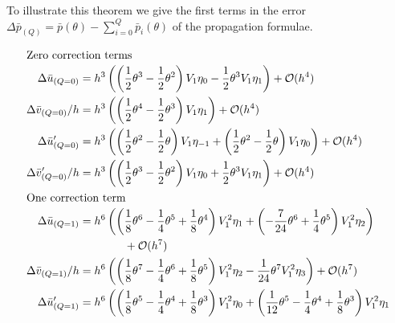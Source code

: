 To illustrate this theorem we give the first terms in the error $\Delta \bar{p}_{(Q)} = \bar{p}(\theta) - \displaystyle\sum_{i=0}^{Q} \bar{p}_{i}(\theta)$  of the propagation formulae.

\begin{align*}
  \intertext{Zero correction terms}
  \Delta \bar{u}_{(Q=0)}    & = h^{3}\left(\left(\frac{1}{2} \theta^{3} - \frac{1}{2} \theta^{2}\right) V_{1} \eta_{0} -\frac{1}{2} \theta^{3} V_{1} \eta_{1}\right) + \mathcal{O}(h^{4})                                                                              \\
  \Delta \bar{v}_{(Q=0)}/h  & = h^{3}\left(\left(\frac{1}{2} \theta^{4} - \frac{1}{2} \theta^{3}\right) V_{1} \eta_{1}\right) + \mathcal{O}(h^{4})                                                                                                                     \\
  \Delta \bar{u}'_{(Q=0)}   & = h^{3}\left(\left(\frac{1}{2} \theta^{2} - \frac{1}{2} \theta\right) V_{1} \eta_{-1} + \left(\frac{1}{2} \theta^{2} - \frac{1}{2} \theta\right) V_{1} \eta_{0}\right) + \mathcal{O}(h^{4})                                              \\
  \Delta \bar{v}'_{(Q=0)}/h & = h^{3}\left(\left(\frac{1}{2} \theta^{3} - \frac{1}{2} \theta^{2}\right) V_{1} \eta_{0} + \frac{1}{2} \theta^{3} V_{1} \eta_{1}\right) + \mathcal{O}(h^{4})                                                                             \\
  \intertext{One correction term}
  \Delta \bar{u}_{(Q=1)}    & = h^{6}\left(\left(\frac{1}{8} \theta^{6} - \frac{1}{4} \theta^{5} + \frac{1}{8} \theta^{4}\right) V_{1}^{2} \eta_{1} + \left(-\frac{7}{24} \theta^{6} + \frac{1}{4} \theta^{5}\right) V_{1}^{2} \eta_{2}\right)                         \\
                            & \qquad\qquad + \mathcal{O}(h^{7})                                                                                                                                                                                                        \\
  \Delta\bar{v}_{(Q=1)}/h   & = h^{6}\left(\left(\frac{1}{8} \theta^{7} - \frac{1}{4} \theta^{6} + \frac{1}{8} \theta^{5}\right) V_{1}^{2} \eta_{2} -\frac{1}{24} \theta^{7} V_{1}^{2} \eta_{3}\right) + \mathcal{O}(h^{7})                                            \\
  \Delta \bar{u}'_{(Q=1)}   & = h^{6}\left(\left(\frac{1}{8} \theta^{5} - \frac{1}{4} \theta^{4} + \frac{1}{8} \theta^{3}\right) V_{1}^{2} \eta_{0} + \left(\frac{1}{12} \theta^{5} - \frac{1}{4} \theta^{4} + \frac{1}{8} \theta^{3}\right) V_{1}^{2} \eta_{1}\right. \\

\end{align*}
